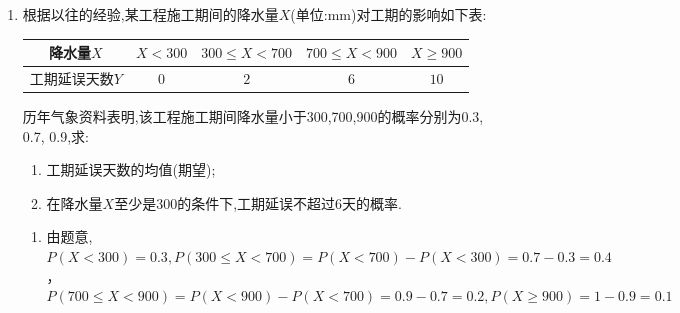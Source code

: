 \begin{enumerate}
\begin{jieda}
    \begin{enumerate}
        \item 由题意, $X$ 可能的取值为 200,300,500,由表格数据知$P\left( {X = {200}}\right)  = \dfrac{2 + {16}}{90} = \dfrac{1}{5},P\left( {X = {300}}\right)  = \dfrac{36}{90} = \dfrac{2}{5},$$P\left( {X = {500}}\right)  = \dfrac{{25} + 7 + 4}{90} = \dfrac{2}{5},$所以 $X$ 的分布列为
        $\begin{pmatrix}
         200 & 300& 500\\
         \dfrac{1}{5} & \dfrac{2}{5} & \dfrac{2}{5}
        \end{pmatrix}$

        \item 由题意,需求量的最小值为 200,最大值为 500,所以只需考虑 ${200} \leq  n \leq  {500}$ 的情形,当 ${300} \leq  n \leq  {500}$ 时,若最高气温不低于 25,则 $Y =$${6n} - {4n} = {2n}$ ;若最高气温位于 $\lbrack {20},{25})$ ,则 $Y = 2 \times  {300} - 2 \times  (n -$${300}) = {1200} - {2n}$ ;若最高气温低于 20,则 $Y = 2 \times  {200} - 2 \times  \left( {n - {200}}\right)  =$${800} - {2n}$ .故 $E\left( Y\right)  = \dfrac{2}{5} \times  {2n} + \dfrac{2}{5}\left( {{1200} - {2n}}\right)  + \dfrac{1}{5}\left( {{800} - {2n}}\right)$$= {640} - \dfrac{2}{5}n$ ,所以当 $n = {300}$ 时, $E\left( Y\right)$ 最大,为 520.当 ${200} \leq  n < {300}$ 时,若最高气温不低于 20,则 $Y =$${6n} - {4n} = {2n}$ ;若最高气温低于 20,则 $Y = 2 \times  {200} - 2\left( {n - {200}}\right)  =$${800} - {2n}$ .故 $E\left( Y\right)  = \dfrac{4}{5} \times  {2n} + \dfrac{1}{5}\left( {{800} - {2n}}\right)  = {160} + \dfrac{6}{5}n <$${160} + \dfrac{6}{5} \times  {300} = {520}.$综上所述,当 $n = {300}$ 时, $Y$ 的数学期望达到最大值 520.
    \end{enumerate}
\end{jieda}

\item 根据以往的经验,某工程施工期间的降水量$X$(单位:mm)对工期的影响如下表:
\begin{center}
\begin{tabular}{|c|c|c|c|c|}
\hline
降水量$X$ & $X<300$ & $300\le X<700$ & $700\le X<900$ & $X\ge900$ \\
\hline
工期延误天数$Y$ & $0$ & $2$ & $6$ & $10$ \\
\hline
\end{tabular}
\end{center}
历年气象资料表明,该工程施工期间降水量小于300,700,900的概率分别为0.3, 0.7, 0.9,求:
\begin{enumerate}
\item 工期延误天数的均值(期望);
\item 在降水量$X$至少是300的条件下,工期延误不超过6天的概率.
\end{enumerate}
\begin{jieda}
    \begin{enumerate}
        \item 由题意,$P(X<300)=0.3,P(300\leq X<700) =P (X<700) -P (X<300) =0.7-0.3=0.4$，$P\left( {{700} \leq  {X} < {900}}\right)  = P \left( {{X} < {900}}\right)  - P \left( {{X} < {700}}\right)=0.9-0.7=0.2, P (X\geq900) =1-0.9=0.1$
        

\end{enumerate}
\end{jieda}
\end{enumerate}
